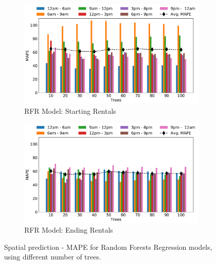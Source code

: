 \begin{figure}
    \begin{center}
         \begin{subfigure}{0.65\textwidth}
             \includegraphics[width=\columnwidth]{figures/spatial_analyses/MAE_hist_rfr_start_err_mean_perc.pdf}
             \caption{RFR Model: Starting Rentals
             \vspace{0.5cm}}
             \label{fig:rfr_start_MAPE}
         \end{subfigure}
         \begin{subfigure}{0.65\textwidth}
             \includegraphics[width=\columnwidth]{figures/spatial_analyses/MAE_hist_rfr_final_err_mean_perc.pdf}
             \caption{RFR Model: Ending Rentals}
             \label{fig:rfr_final_MAPE}
         \end{subfigure}         
 	\caption{Spatial prediction - MAPE for Random Forests Regression models, using different number of trees.}
    \label{fig:reg_MAPE_RF}
\end{center}
\end{figure}

